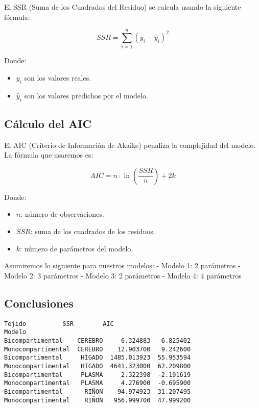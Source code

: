 \documentclass[11pt]{article}
\providecommand{\tightlist}{%
      \setlength{\itemsep}{0pt}\setlength{\parskip}{0pt}}
\begin{document}
El SSR (Suma de los Cuadrados del Residuo) se calcula usando la
siguiente fórmula:

\[
SSR = \sum_{i=1}^{n} (y_i - \hat{y}_i)^2
\]

Donde:

\begin{itemize}
\tightlist
\item
  \(y_i\) son los valores reales.
\item
  \(\hat{y}_i\) son los valores predichos por el modelo.
\end{itemize}

    \subsection{Cálculo del AIC}\label{cuxe1lculo-del-aic}

El AIC (Criterio de Información de Akaike) penaliza la complejidad del
modelo. La fórmula que usaremos es:

\[
AIC = n \cdot \ln\left(\frac{SSR}{n}\right) + 2k
\]

Donde:

\begin{itemize}
\tightlist
\item
  \(n\): número de observaciones.
\item
  \(SSR\): suma de los cuadrados de los residuos.
\item
  \(k\): número de parámetros del modelo.
\end{itemize}

Asumiremos lo siguiente para nuestros modelos: - Modelo 1: 2 parámetros
- Modelo 2: 3 parámetros - Modelo 3: 2 parámetros - Modelo 4: 4
parámetros

    \subsection{Conclusiones}\label{conclusiones}

    \begin{Verbatim}[commandchars=\\\{\}]
                     Tejido          SSR        AIC
Modelo
Bicompartimental    CEREBRO     6.324883   6.825402
Monocompartimental  CEREBRO    12.903700   9.242600
Bicompartimental     HIGADO  1485.013923  55.953594
Monocompartimental   HIGADO  4641.323000  62.209800
Bicompartimental     PLASMA     2.322398  -2.191619
Monocompartimental   PLASMA     4.276900  -0.695900
Bicompartimental      RIÑON    94.974923  31.207495
Monocompartimental    RIÑON   956.999700  47.999200
    \end{Verbatim}
\end{document}
